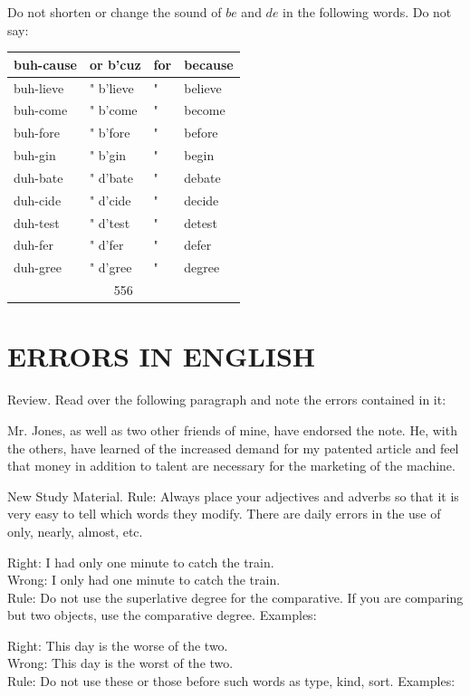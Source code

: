 \documentclass[10pt]{article}
\begin{document}
Do not shorten or change the sound of $b e$ and $d e$ in the following words. Do not say:

\begin{center}
\begin{tabular}{|l|l|l|l|}
\hline
buh-cause & or b'cuz & for & because \\
\hline
buh-lieve & " b'lieve & " & believe \\
\hline
buh-come & " b'come & " & become \\
\hline
buh-fore & " b'fore & " & before \\
\hline
buh-gin & " b'gin & " & begin \\
\hline
duh-bate & " d'bate & " & debate \\
\hline
duh-cide & " d'cide & " & decide \\
\hline
duh-test & " d'test & " & detest \\
\hline
duh-fer & " d'fer & " & defer \\
\hline
duh-gree & " d'gree & " & degree \\
\hline
\multicolumn{4}{|c|}{556} \\
\hline
\end{tabular}
\end{center}

\section*{ERRORS IN ENGLISH}
Review. Read over the following paragraph and note the errors contained in it:

Mr. Jones, as well as two other friends of mine, have endorsed the note. He, with the others, have learned of the increased demand for my patented article and feel that money in addition to talent are necessary for the marketing of the machine.

New Study Material. Rule: Always place your adjectives and adverbs so that it is very easy to tell which words they modify. There are daily errors in the use of only, nearly, almost, etc.

Right: I had only one minute to catch the train.\\
Wrong: I only had one minute to catch the train.\\
Rule: Do not use the superlative degree for the comparative. If you are comparing but two objects, use the comparative degree. Examples:

Right: This day is the worse of the two.\\
Wrong: This day is the worst of the two.\\
Rule: Do not use these or those before such words as type, kind, sort. Examples:
\end{document}

